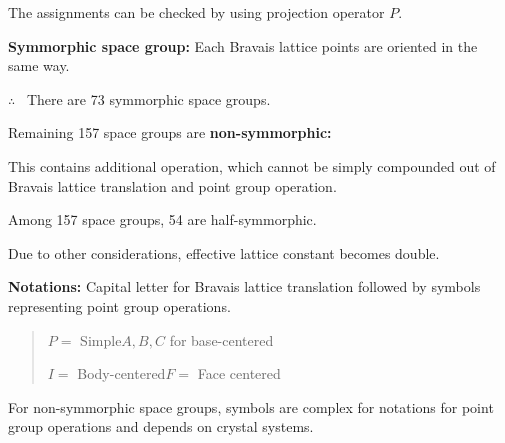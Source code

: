 The assignments can be checked by using projection operator $P$.

\noindent
{\bf Symmorphic space group:} Each Bravais lattice points are oriented in the same way.

$\therefore$ \ There are 73 symmorphic space groups.

Remaining 157 space groups are {\bf non-symmorphic:} 

This contains additional operation, which cannot be simply compounded out of Bravais lattice translation and point group operation.

Among 157 space groups, 54 are half-symmorphic.

Due to other considerations, effective lattice constant becomes double.

\noindent
{\bf Notations:} Capital letter for Bravais lattice translation followed by symbols representing point group operations.
\begin{quote}
$P =$ Simple\qquad $A,B,C$ for base-centered

$I=$ Body-centered\qquad $F=$ Face centered
\end{quote}
For non-symmorphic space groups, symbols are complex for notations for point group operations and depends on crystal systems.
